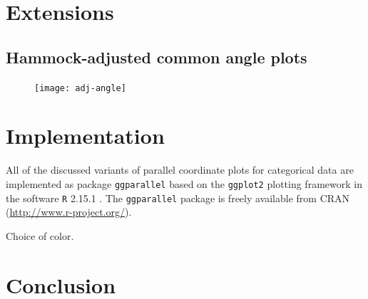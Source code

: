 \section{Extensions}
\subsection{Hammock-adjusted common angle plots}

\begin{figure}[hbtp]
\texttt{[image: adj-angle]}
\end{figure}
\section{Implementation}

All  of the discussed variants of parallel coordinate plots for categorical data are implemented as package {\tt ggparallel} based on the {\tt ggplot2} \cite{ggplot2} plotting framework in the software {\tt R} 2.15.1 \citep{R}. The  {\tt ggparallel} package is freely available from CRAN (\url{http://www.r-project.org/}).

Choice of color. 


\section{Conclusion}







